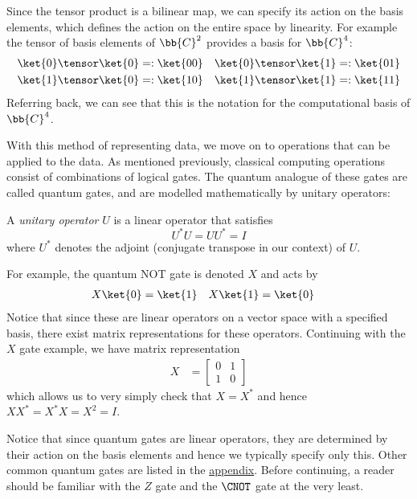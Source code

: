 \documentclass{article}
\begin{document}
        Since the tensor product is a bilinear map, we can specify its action on the basis elements, which defines the action on the entire space by linearity.
        For example the tensor of basis elements of $\bb{C}^2$ provides a basis for $\bb{C}^4$:
        \begin{align*}
        \ket{0} \tensor \ket{0} &=: \ket{00} & \ket{0} \tensor \ket{1} &=: \ket{01}\\
        \ket{1} \tensor \ket{0} &=: \ket{10} & \ket{1} \tensor \ket{1} &=: \ket{11}
        \end{align*}
        Referring back, we can see that this is the notation for the computational basis of $\bb{C}^4$.

        With this method of representing data, we move on to operations that can be applied to the data.
        As mentioned previously, classical computing operations consist of combinations of logical gates.
        The quantum analogue of these gates are called quantum gates, and are modelled mathematically by unitary operators:

        \begin{definition}
                A \textit{unitary operator} $U$ is a linear operator that satisfies
                        $$U^* U = UU^* = I$$
                where $U^*$ denotes the adjoint (conjugate transpose in our context) of $U$.
        \end{definition}

        For example, the quantum NOT gate is denoted $X$ and acts by
        \begin{align*}
                X \ket{0} &= \ket{1} & X \ket{1} &= \ket{0}
        \end{align*}
        Notice that since these are linear operators on a vector space with a specified basis, there exist matrix representations for these operators.
        Continuing with the $X$ gate example, we have matrix representation
        \begin{align*}
        X &= \begin{bmatrix} 0 & 1 \\ 1 & 0 \end{bmatrix}
        \end{align*}
        which allows us to very simply check that $X = X^*$ and hence $XX^* = X^* X = X^2 = I$.

        Notice that since quantum gates are linear operators, they are determined by their action on the basis elements and hence we typically specify only this.
        Other common quantum gates are listed in the \hyperref[appendix:code]{appendix}.
        Before continuing, a reader should be familiar with the $Z$ gate and the $\CNOT$ gate at the very least.
        
\end{document}
